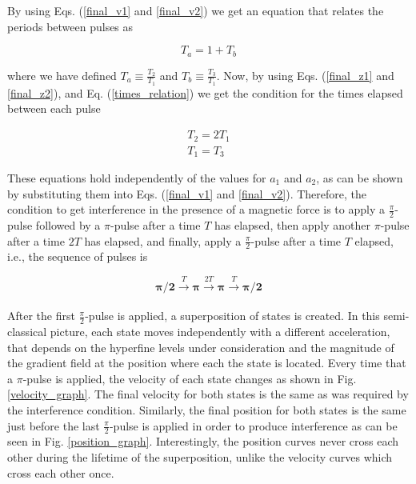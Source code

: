 \documentclass{article}
\begin{document}
By using Eqs. (\ref{final_v1} and \ref{final_v2}) we get an equation that relates the periods between pulses as

\begin{equation}\label{times_relation}
T_{a} = 1 + T_{b}
\end{equation}

where we have defined $T_{a} \equiv \frac{T_{2}}{T_{1}}$ and $T_{b} \equiv \frac{T_{3}}{T_{1}}$. Now, by using Eqs. (\ref{final_z1} and \ref{final_z2}), and Eq. (\ref{times_relation}) we get the condition for the times elapsed between each pulse

\begin{equation}
\begin{aligned}
T_{2} = 2T_{1} \\
T_{1} = T_{3}
\end{aligned}
\end{equation}

These equations hold independently of the values for $a_{1}$ and $a_{2}$, as can be shown by substituting them into Eqs. (\ref{final_v1} and \ref{final_v2}). Therefore, the condition to get interference in the presence of a magnetic force is to apply a 
$\frac{\pi}{2}$-pulse followed by a $\pi$-pulse after a time $T$ has elapsed, then apply another $\pi$-pulse after a time $2T$ has elapsed, and finally, apply a $\frac{\pi}{2}$-pulse after a time $T$ elapsed, i.e., the sequence of pulses is

\begin{equation}\label{pulses}
\boldsymbol{\pi/2} \xrightarrow[]{T} \boldsymbol{\pi} \xrightarrow[]{2T} \boldsymbol{\pi} \xrightarrow[]{T} \boldsymbol{\pi/2}
\end{equation}

After the first $\frac{\pi}{2}$-pulse is applied, a superposition of states is created. In this semi-classical picture, each state moves independently with a different acceleration, that depends on the hyperfine levels under consideration and the magnitude of the gradient field at the position where each the state is located. Every time that a $\pi$-pulse is applied, the velocity of each state changes as shown in Fig. \ref{velocity_graph}. The final velocity for both states is the same as was required by the interference condition. Similarly, the final position for both states is the same just before the last $\frac{\pi}{2}$-pulse is applied in order to produce interference as can be seen in Fig. \ref{position_graph}. Interestingly, the position curves never cross each other during the lifetime of the superposition, unlike the velocity curves which cross each other once.
\end{document}

